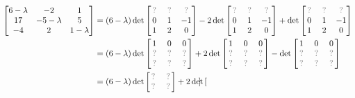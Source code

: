 \begin{applicationActivities}{3}{27}
\begin{activity}{15}
  \begin{align*}
    \begin{bmatrix} 6-\lambda & -2 & 1 \\ 17 & -5-\lambda & 5 \\ -4 & 2 & 1-\lambda \end{bmatrix}
  &=
    (6-\lambda)\det \begin{bmatrix}
      \unknown & \unknown & \unknown \\
      0 & 1 & -1 \\
      1 & 2 & 0
    \end{bmatrix}
    -2\det \begin{bmatrix}
      \unknown & \unknown & \unknown \\
      0 & 1 & -1 \\
      1 & 2 & 0
    \end{bmatrix}
    +\det \begin{bmatrix}
      \unknown & \unknown & \unknown \\
      0 & 1 & -1 \\
      1 & 2 & 0
    \end{bmatrix}
  \\ &=
    (6-\lambda)\det \begin{bmatrix}
      1 & 0 & 0 \\
      \unknown & \unknown & \unknown \\
      \unknown & \unknown & \unknown \\
    \end{bmatrix}
    +2\det \begin{bmatrix}
      1 & 0 & 0 \\
      \unknown & \unknown & \unknown \\
      \unknown & \unknown & \unknown \\
    \end{bmatrix}
    -\det \begin{bmatrix}
      1 & 0 & 0 \\
      \unknown & \unknown & \unknown \\
      \unknown & \unknown & \unknown \\
    \end{bmatrix}
  \\ &=
    (6-\lambda)\det \begin{bmatrix}
      \unknown & \unknown \\
      \unknown & \unknown \\
    \end{bmatrix}
    +2\det \begin{bmatrix}

\end{bmatrix}
\end{align*}
\end{activity}
\end{applicationActivities}
